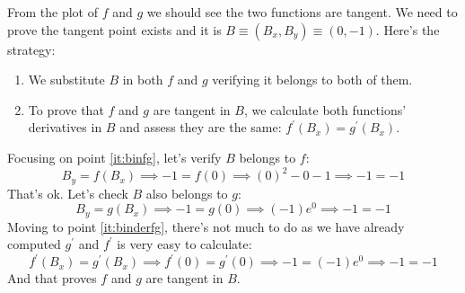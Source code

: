 From the plot of $f$ and $g$ we should see the two functions are tangent. We need to prove
the tangent point exists and it is $B \equiv (B_x,B_y) \equiv (0,-1)$.
Here's the strategy:
\begin{enumerate}
    \item \label{it:binfg} We substitute $B$ in both $f$ and $g$ verifying it belongs to both of them.
    \item \label{it:binderfg} To prove that $f$ and $g$ are tangent in $B$, we calculate
        both functions' derivatives in $B$ and assess they are the
        same:
        $f^\prime(B_x) = g^\prime(B_x)$.
\end{enumerate}
Focusing on point \ref{it:binfg}, let's verify $B$ belongs to $f$:
\begin{equation*}
    B_y = f(B_x) \implies -1 = f(0) \implies (0)^2 - 0 - 1 \implies -1 = -1
\end{equation*}
That's ok. Let's check $B$ also belongs to $g$:
\begin{equation*}
    B_y = g(B_x) \implies -1 = g(0) \implies (-1)e^{0} \implies -1 = -1
\end{equation*}
Moving to point \ref{it:binderfg}, there's not much to do as we have already computed
$g^\prime$ and $f^\prime$ is very easy to calculate:
\begin{equation*}
    f^\prime(B_x) = g^\prime(B_x) \implies f^\prime(0) = g^\prime(0)
        \implies -1 = (-1) e^{0} \implies -1 = -1
\end{equation*}
And that proves $f$ and $g$ are tangent in $B$.

